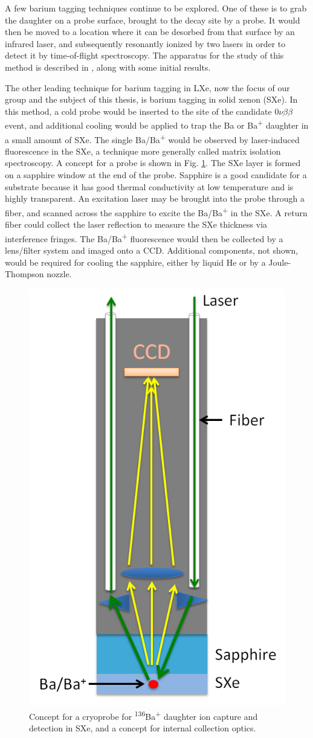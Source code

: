 A few barium tagging techniques continue to be explored.  One of these is to grab the daughter on a probe surface, brought to the decay site by a probe.  It would then be moved to a location where it can be desorbed from that surface by an infrared laser, and subsequently resonantly ionized by two lasers in order to detect it by time-of-flight spectroscopy.  The apparatus for the study of this method is described in \cite{Twelker2014}, along with some initial results.

The other leading technique for barium tagging in LXe, now the focus of our group and the subject of this thesis, is barium tagging in solid xenon (SXe).  In this method, a cold probe would be inserted to the site of the candidate $0\nu\beta\beta$ event, and additional cooling would be applied to trap the Ba or Ba\textsuperscript{+} daughter in a small amount of SXe.  The single Ba/Ba\textsuperscript{+} would be observed by laser-induced fluorescence in the SXe, a technique more generally called matrix isolation spectroscopy.  A concept for a probe is shown in Fig. \ref{fig:probe}.  The SXe layer is formed on a sapphire window at the end of the probe.  Sapphire is a good candidate for a substrate because it has good thermal conductivity at low temperature and is highly transparent.  An excitation laser may be brought into the probe through a fiber, and scanned across the sapphire to excite the Ba/Ba\textsuperscript{+} in the SXe.  A return fiber could collect the laser reflection to measure the SXe thickness via interference fringes.  The Ba/Ba\textsuperscript{+} fluorescence would then be collected by a lens/filter system and imaged onto a CCD.  Additional components, not shown, would be required for cooling the sapphire, either by liquid He or by a Joule-Thompson nozzle.

\begin{figure} %
	\centering
	\includegraphics[width=.5\textwidth]{figures/probe_flat.png}
	\caption{Concept for a cryoprobe for \textsuperscript{136}Ba\textsuperscript{+} daughter ion capture and detection in SXe, and a concept for internal collection optics.}
\label{fig:probe}
\end{figure}

